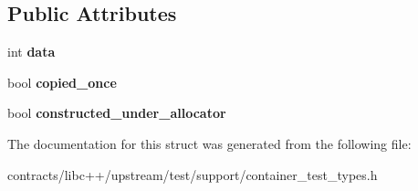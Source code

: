 \subsection*{Public Attributes}
\begin{DoxyCompactItemize}
\item 
\mbox{\label{struct_copy_insertable_a729f33a22b4d70fd83db065e9c50fa3c}} 
int {\bfseries data}
\item 
\mbox{\label{struct_copy_insertable_ac83620b58552b3fa4753a1b063f3571c}} 
bool {\bfseries copied\+\_\+once}
\item 
\mbox{\label{struct_copy_insertable_ad827830bc1618ba8deef20bb2b17fb90}} 
bool {\bfseries constructed\+\_\+under\+\_\+allocator}
\end{DoxyCompactItemize}


The documentation for this struct was generated from the following file\+:\begin{DoxyCompactItemize}
\item 
contracts/libc++/upstream/test/support/container\+\_\+test\+\_\+types.\+h\end{DoxyCompactItemize}
